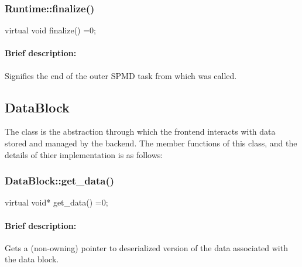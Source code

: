 \subsubsection{Runtime::finalize()}
\begin{CppCode}
    virtual void
    finalize() =0;
\end{CppCode}

\paragraph{Brief description:} Signifies the end of the outer SPMD task from which  was called.
     



\subsection{{DataBlock}}

The  class is the abstraction through which the frontend interacts with data stored and managed by the backend. The 
member functions of this class, and the details of thier implementation is as follows:

\subsubsection{DataBlock::get\_data()}
\begin{CppCode}
    virtual void*
    get_data() =0;
\end{CppCode}

\paragraph{Brief description:} Gets a (non-owning) pointer to deserialized version of the data associated with
      the data block.


%



